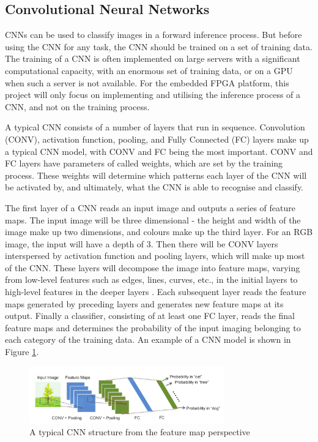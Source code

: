 \documentclass[12pt]{article}
\begin{document}
\subsection{Convolutional Neural Networks}
\label{sec:Background-CNN}
\vspace{-12pt}

CNNs can be used to classify images in a forward inference process. But before using the CNN for any task, the CNN should be trained on a set of training data. The training of a CNN is often implemented on large servers with a significant computational capacity, with an enormous set of training data, or on a GPU when such a server is not available. For the embedded FPGA platform, this project will only focus on implementing and utilising the inference process of a CNN, and not on the training process.

A typical CNN consists of a number of layers that run in sequence. Convolution (CONV), activation function, pooling, and Fully Connected (FC) layers make up a typical CNN model, with CONV and FC being the most important. CONV and FC layers have parameters of called weights, which are set by the training process. These weights will determine which patterns each layer of the CNN will be activated by, and ultimately, what the CNN is able to recognise and classify. 

The first layer of a CNN reads an input image and outputs a series of feature maps. The input image will be three dimensional - the height and width of the image make up two dimensions, and colours make up the third layer. For an RGB image, the input will have a depth of 3. Then there will be CONV layers interspersed by activation function and pooling layers, which will make up most of the CNN. These layers will decompose the image into feature maps, varying from low-level features such as edges, lines, curves, etc., in the initial layers to high-level features in the deeper layers \cite{SudaFpgaAccelerator}. Each subsequent layer reads the feature maps generated by preceding layers and generates new feature maps at its output. Finally a classifier, consisting of at least one FC layer, reads the final feature maps and determines the probability of the input imaging belonging to each category of the training data. An example of a CNN model is shown in Figure \ref{fig:typicalCNN}.
\begin{figure}[h]
\centering
\includegraphics[width=0.75\textwidth]{../figures/typicalCnn}
\caption{A typical CNN structure from the feature map perspective \cite{embeddedFpgaCnn} \label{fig:typicalCNN}}
\end{figure}
\vspace{-12pt}
\end{document}
